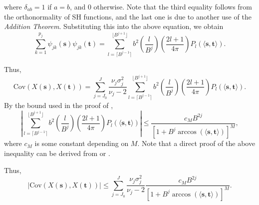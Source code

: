 \documentclass[aoas,preprint]{imsart}
\numberwithin{equation}{section}
\theoremstyle{plain}
\begin{document}
	where $\delta_{ab}=1$ if $a=b$, and $0$ otherwise. Note that the third equality follows from the orthonormality of SH functions, and the last one is
	due to another use of the \textit{Addition Theorem}. Substituting this into the above equation, we obtain 
	\[
	\sum_{k=1}^{p_j} \psi_{jk}(\textbf{s}) \psi_{jk}(\textbf{t})
	=  \sum \limits_{l=\lceil B^{j-1} \rceil}^{\lfloor B^{j+1} \rfloor} b^2 \left( \frac{l}{B^j} \right) \left(\frac{2l+1}{4\pi} \right)P_l(\langle \textbf{s}, \textbf{t} \rangle).
	\]

Thus,
$$\mbox{Cov}(X(\textbf{s}), X(\textbf{t}))=\sum \limits_{j=J_0}^J \frac{\nu_j \sigma_j^2}{\nu_j-2}\sum \limits_{l=\lceil B^{j-1} \rceil}^{\lfloor B^{j+1} \rfloor} b^2 \left( \frac{l}{B^j} \right) \left(\frac{2l+1}{4\pi}\right) P_l(\langle \textbf{s}, \textbf{t} \rangle).
$$
By the bound used in the proof of \citet[Lemma 3]{Baldi-09},
$$\left\lvert \sum \limits_{l=\lceil B^{j-1} \rceil}^{\lfloor B^{j+1} \rfloor} b^2 \left( \frac{l}{B^j} \right) \left(\frac{2l+1}{4\pi} \right)P_l(\langle \textbf{s}, \textbf{t} \rangle) \right\rvert \leq \frac{c_M B^{2j}}{[1+B^j \arccos (\langle \textbf{s}, \textbf{t} \rangle)]^M},$$
where $c_M$ is some constant depending on $M$. Note that a direct proof of the above inequality can be derived from \citet[Theorem 3.5]{Narcowich-etal06} or \citet[Theorem 2.6.7]{Dai-13}.

Thus,
$$\lvert \mbox{Cov}(X(\textbf{s}), X(\textbf{t})) \rvert \leq \sum \limits_{j=J_0}^J \frac{\nu_j \sigma_j^2}{\nu_j-2}\frac{c_M B^{2j}}{[1+B^j \arccos (\langle \textbf{s}, \textbf{t} \rangle)]^M}.$$
\end{document}
